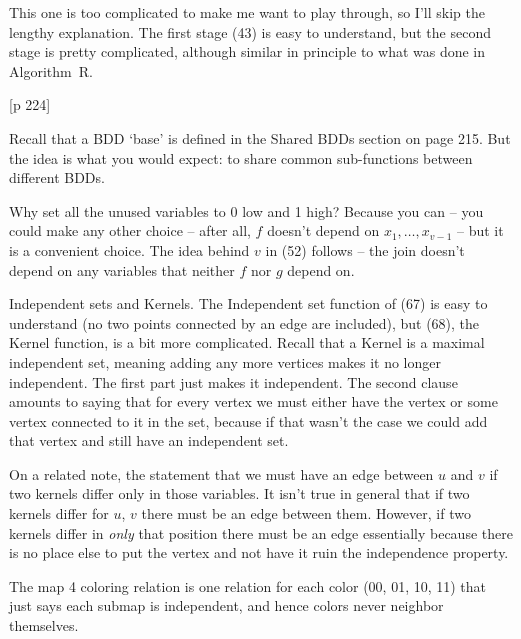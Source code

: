 \vskip 0.08in 
This one is too complicated to make me want to play through, so
I'll skip the lengthy explanation.  The first stage (43) is easy
to understand, but the second stage is pretty complicated, although
similar in principle to what was done in Algorithm~R.

\vskip 0.08in [p 224] 

\noindent Recall that a BDD `base' is defined in the Shared BDDs section
on page 215.  But the idea is what you would expect: to share
common sub-functions between different BDDs.

\noindent [p 225] Why set all the unused variables to 0 low
and 1 high?  Because you can -- you could make any other
choice -- after all, $f$ doesn't depend on $x_1, \ldots, x_{v-1}$ --
but it is a convenient choice.  The idea behind $v$ in (52) follows --
the join doesn't depend on any variables that neither $f$ nor $g$
depend on.

\vskip 0.08in 

\noindent [p231] Independent sets and Kernels.  The Independent
set function of (67) is easy to understand (no two points connected
by an edge are included), but (68), the Kernel function, is a bit
more complicated.  Recall that a Kernel is a maximal independent set,
meaning adding any more vertices makes it no longer independent.
The first part just makes it independent.  The second clause amounts
to saying that for every vertex we must either have the vertex or
some vertex connected to it in the set, because if that wasn't the case 
we could add that vertex and still have an independent set.

On a related note, the statement that we must have an edge between
$u$ and $v$ if two kernels differ only in those variables.  It isn't
true in general that if two kernels differ for $u$, $v$ there must be 
an edge between them. However, if two kernels differ in {\it only} that
position there must be an edge essentially because there is no place
else to put the vertex and not have it ruin the independence property.

\vskip 0.08in 

\noindent [p 233] The map 4 coloring relation is one relation
for each color (00, 01, 10, 11) that just says each submap
is independent, and hence colors never neighbor themselves.

\vskip 0.08in 

